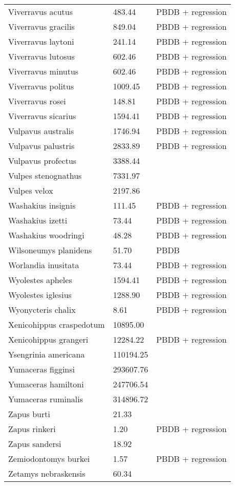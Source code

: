 \documentclass{article}
\begin{document}
\begin{center}
\begin{longtable}{p{} p{} p{}}
    Viverravus acutus & 483.44 & PBDB + regression \\ 
    Viverravus gracilis & 849.04 & PBDB + regression \\ 
    Viverravus laytoni & 241.14 & PBDB + regression \\ 
    Viverravus lutosus & 602.46 & PBDB + regression \\ 
    Viverravus minutus & 602.46 & PBDB + regression \\ 
    Viverravus politus & 1009.45 & PBDB + regression \\ 
    Viverravus rosei & 148.81 & PBDB + regression \\ 
    Viverravus sicarius & 1594.41 & PBDB + regression \\ 
    Vulpavus australis & 1746.94 & PBDB + regression \\ 
    Vulpavus palustris & 2833.89 & PBDB + regression \\ 
    Vulpavus profectus & 3388.44 & \cite{Williamson2013} \\ 
    Vulpes stenognathus & 7331.97 & \cite{Tomiya2013} \\ 
    Vulpes velox & 2197.86 & \cite{Smith2004} \\ 
    Washakius insignis & 111.45 & PBDB + regression \\ 
    Washakius izetti & 73.44 & PBDB + regression \\ 
    Washakius woodringi & 48.28 & PBDB + regression \\ 
    Wilsoneumys planidens & 51.70 & PBDB \\ 
    Worlandia inusitata & 73.44 & PBDB + regression \\ 
    Wyolestes apheles & 1594.41 & PBDB + regression \\ 
    Wyolestes iglesius & 1288.90 & PBDB + regression \\ 
    Wyonycteris chalix & 8.61 & PBDB + regression \\ 
    Xenicohippus craspedotum & 10895.00 & \cite{McKenna2011} \\ 
    Xenicohippus grangeri & 12284.22 & PBDB + regression \\ 
    Ysengrinia americana & 110194.25 & \cite{Tomiya2013} \\ 
    Yumaceras figginsi & 293607.76 & \cite{Tomiya2013} \\ 
    Yumaceras hamiltoni & 247706.54 & \cite{Tomiya2013} \\ 
    Yumaceras ruminalis & 314896.72 & \cite{Tomiya2013} \\ 
    Zapus burti & 21.33 & \cite{Tomiya2013} \\ 
    Zapus rinkeri & 1.20 & PBDB + regression \\ 
    Zapus sandersi & 18.92 & \cite{Tomiya2013} \\ 
    Zemiodontomys burkei & 1.57 & PBDB + regression \\ 
    Zetamys nebraskensis & 60.34 & \cite{Tomiya2013} \\ 
  \end{longtable}
\end{center}

\end{document}
